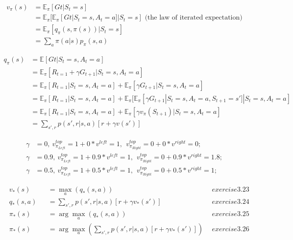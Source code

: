 \documentclass{article}
\begin{document}
\[
  \begin{aligned}
    v_{\pi}(s) &= \mathbb{E}_{\pi} [Gt | S_t = s]\\
    &= \mathbb{E}_{\pi} [ \mathbb{E}_{\pi}[ Gt | S_t=s, A_t = a] | S_t=s] \text{ (the law of iterated expectation)} \\
    &= \mathbb{E}_{\pi} [ q_{\pi}(s, \pi(s)) | S_{t}=s]\\
    &= \sum_{a}\pi(a|s) p_{\pi}(s, a)
  \end{aligned}
\]

\[
  \begin{aligned}
    q_{\pi}(s) &= \mathbb{E}[ Gt | S_t=s, A_t = a]\\
    &= \mathbb{E}_{\pi} [ R_{t=1} + \gamma G_{t+1} | S_t=s, A_t = a] \\
    &= \mathbb{E}_{\pi} [ R_{t=1} | S_t=s, A_t = a] + \mathbb{E}_{\pi} [ \gamma G_{t+1} | S_t=s, A_t = a] \\
    &= \mathbb{E}_{\pi} [ R_{t=1} | S_t=s, A_t = a] + \mathbb{E}_{\pi} [ \mathbb{E}_{\pi} [\gamma G_{t+1} | S_t=s, A_t = a, S_{t+1} = s'] | S_t=s, A_t = a] \\
    &= \mathbb{E}_{\pi} [ R_{t=1} | S_t=s, A_t = a] + \mathbb{E}_{\pi} [\gamma v_{\pi}(S_{t+1}) | S_t=s, A_t = a] \\
    &= \sum_{s', r} p(s',r|s,a) [r + \gamma v(s')]
  \end{aligned}
\]

\[
  \begin{aligned}
    \gamma &= 0, \ v_{\pi_{Left}}^{top} = 1 + 0 * v^{left} = 1, \ \ v_{\pi_{Right}}^{top} = 0 + 0 * v^{right} = 0; \\
    \gamma &= 0.9, \ v_{\pi_{Left}}^{top} = 1 + 0.9 * v^{left} = 1, \ \ v_{\pi_{Right}}^{top} = 0 + 0.9 * v^{right} = 1.8; \\
    \gamma &= 0.5, \ v_{\pi_{Left}}^{top} = 1 + 0.5 * v^{left} = 1, \ \ v_{\pi_{Right}}^{top} = 0 + 0.5 * v^{right} = 1;
  \end{aligned}
\]

\[
  \begin{aligned}
    &v_*(s) &&= \max_a (q_*(s, a)) \ \ &exercise3.23 \\
    &q_*(s,a) &&= \sum_{s',r} p(s',r|s,a)[r + \gamma v_*(s')] \ \ &exercise3.24 \\
    &\pi_*(s) &&= \arg\max_a (q_*(s, a))  \ \ &exercise3.25 \\
    &\pi_*(s) &&= \arg\max_a (\sum_{s',r} p(s',r|s,a)[r + \gamma v_*(s')])  \ \ &exercise3.26
  \end{aligned}
\]
\end{document}
